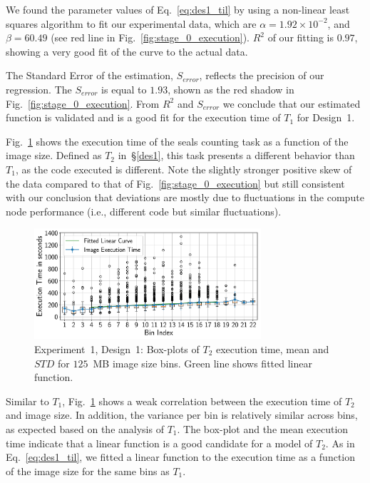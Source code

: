 We found the parameter values of Eq.~\ref{eq:des1_til} by using a non-linear
least squares algorithm to fit our experimental data, which are
$\alpha= 1.92 \times 10^{-2}$, and $\beta = 60.49$ (see red line in
Fig.~\ref{fig:stage_0_execution}). $R^{2}$ of our fitting is $0.97$, showing a
very good fit of the curve to the actual data.

The Standard Error of the estimation, $S_{error}$, reflects the precision of
our regression. The $S_{error}$ is equal to $1.93$, shown as the red shadow in
Fig.~\ref{fig:stage_0_execution}. From $R^{2}$ and $S_{error}$ we conclude
that our estimated function is validated and is a good fit for the execution
time of $T_{1}$ for Design~1.

Fig.~\ref{fig:stage_1_execution} shows the execution time of the seals
counting task as a function of the image size. Defined as $T_{2}$
in~\S\ref{des1}, this task presents a different behavior than $T_{1}$, as the
code executed is different. Note the slightly stronger positive skew of the
data compared to that of Fig.~\ref{fig:stage_0_execution} but still consistent
with our conclusion that deviations are mostly due to fluctuations in the
compute node performance (i.e., different code but similar fluctuations).

\begin{figure}[t]
    \centering
    \includegraphics[width=0.75\textwidth]{figures/designs/stage_1_tx_box.pdf}
    \caption{Experiment~1, Design~1: Box-plots of $T_{2}$ execution time, mean
    and $STD$ for $125$~MB image size bins. Green line shows fitted linear
    function.}
    \label{fig:stage_1_execution}
\end{figure}

Similar to $T_{1}$, Fig.~\ref{fig:stage_1_execution} shows a weak correlation
between the execution time of $T_{2}$ and image size. In addition, the
variance per bin is relatively similar across bins, as expected based on the
analysis of $T_{1}$. The box-plot and the mean execution time indicate that a
linear function is a good candidate for a model of $T_{2}$. As in
Eq.~\ref{eq:des1_til}, we fitted a linear function to the execution time as a
function of the image size for the same bins as $T_{1}$.

